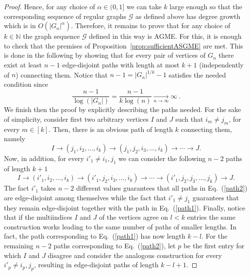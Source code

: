 \documentclass[a4paper,onecolumn,accepted=2024-12-14]{quantumarticle}
\theoremstyle{plain}
\newcommand{\cG}{{\mathcal G}}         %
\begin{document}
\begin{proof}
Hence, for any choice of $\alpha\in(0,1]$ we can take $k$ large enough so that the corresponding sequence of regular graphs $\cG$ as defined above has degree growth which is in $O(|G_n|^\alpha)$. Therefore, it remains to prove that for any choice of $k\in\mathbb{N}$ the graph sequence $\cG$ defined in this way is AGME. For this, it is enough to check that the premises of Proposition~\ref{prop:sufficientASGME} are met. This is done in the following by showing that for every pair of vertices of $G_n$ there exist at least $n-1$ edge-disjoint paths with length at most $k+1$ (independently of $n$) connecting them. Notice that $n-1=|G_n|^{1/k}-1$
satisfies the needed condition since
\begin{equation}
 \frac{n-1}{\log(|G_n|)}=\frac{n-1}{k\log(n)}\xrightarrow[n\to\infty]{} \infty\,.
\end{equation}
We finish then the proof by explicitly describing the paths needed.
For the sake of simplicity, consider first two arbitrary vertices $I$ and $J$ such that $i_m\neq j_m$, for every $m\in [k]$.
Then, there is an obvious path of length $k$ connecting them, namely
\begin{equation}\label{path1}
I\rightarrow(j_1,i_2,\ldots,i_k)\rightarrow(j_1,j_2,i_3,\ldots,i_k)\rightarrow\cdots\rightarrow J.
\end{equation}
Now, in addition, for every $i'_1\neq i_1,j_1$ we can consider the following $n-2$ paths of length $k+1$
\begin{equation}\label{path2}
I\rightarrow(i'_1,i_2,\ldots,i_k)\rightarrow(i'_1,j_2,i_3,\ldots,i_k)\rightarrow\cdots\rightarrow(i'_1,j_2,j_3,\ldots,j_k)\rightarrow J.
\end{equation}
The fact $i'_1$ takes $n-2$ different values guarantees that all paths in Eq.~(\ref{path2}) are edge-disjoint among themselves while the fact that $i'_1\neq j_1$ guarantees that they remain edge-disjoint together with the path in Eq.~(\ref{path1}). Finally, notice that if the multiindices $I$ and $J$ of the vertices agree on $l<k$ entries the same construction works leading to the same number of paths of smaller lengths. In fact, the path corresponding to Eq.~(\ref{path1}) has now length $k-l$. For the remaining $n-2$ paths corresponding to Eq.~(\ref{path2}), let $p$ be the first entry for which $I$ and $J$ disagree and consider the analogous construction for every $i'_p\neq i_p,j_p$, resulting in edge-disjoint paths of length $k-l+1$.
\end{proof}
\end{document}
